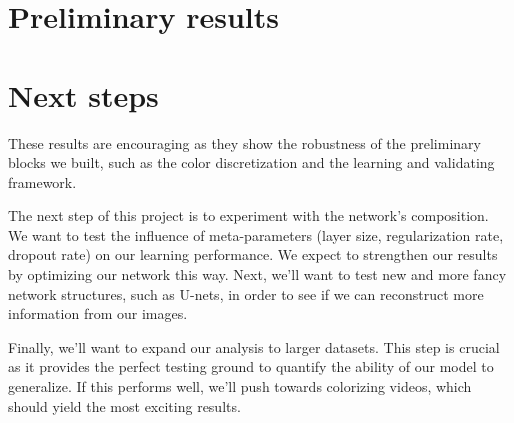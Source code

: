 \documentclass[10pt,twocolumn,letterpaper]{article}
\begin{document}

\section{Preliminary results}


\section{Next steps}

These results are encouraging as they show the robustness of the preliminary blocks we built, such as the color discretization and the learning and validating framework.

The next step of this project is to experiment with the network's composition. We want to test the influence of meta-parameters (layer size, regularization rate, dropout rate) on our learning performance. We expect to strengthen our results by optimizing our network this way. Next, we'll want to test new and more fancy network structures, such as U-nets, in order to see if we can reconstruct more information from our images.

Finally, we'll want to expand our analysis to larger datasets. This step is crucial as it provides the perfect testing ground to quantify the ability of our model to generalize. If this performs well, we'll push towards colorizing videos, which should yield the most exciting results.

{\small


}
\end{document}

